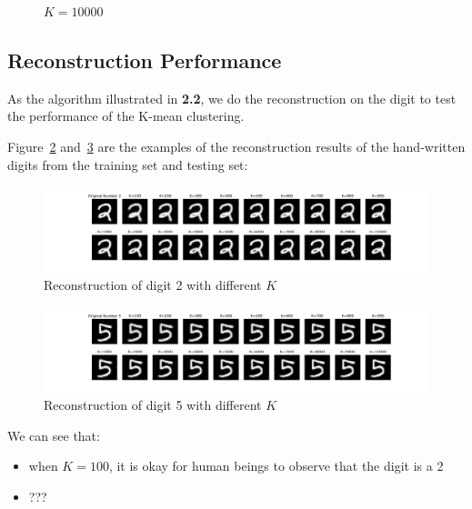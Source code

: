 \documentclass{article}
\begin{document}
\begin{itemize}
\begin{figure}[htbp!]
\begin{minipage}{0.4\textwidth}
        \caption{$K = 10000$}
        \label{fig:10000-centroids}
    \end{minipage}
\end{figure}
    
\end{itemize}
\clearpage

\subsection{Reconstruction Performance}

As the algorithm illustrated in \textbf{2.2}, we do the reconstruction on the digit to test the performance of the K-mean clustering.

Figure~\ref{fig:digit-train} and~\ref{fig:digit-test} are the examples of the reconstruction results of the hand-written digits from the training set and testing set:

\begin{figure}[htbp!]
    \centering
    \includegraphics[width = \textwidth]{K-means/Result/Digits/reconstruct-train-digit.png}
    \caption{Reconstruction of digit 2 with different $K$}
    \label{fig:digit-train}
\end{figure}
\begin{figure}[htbp!]
    \centering
    \includegraphics[width = \textwidth]{K-means/Result/Digits/reconstruct-test-digit.png}
    \caption{Reconstruction of digit 5 with different $K$}
    \label{fig:digit-test}
\end{figure}

We can see that:

\begin{itemize}
    \item when $K = 100$, it is okay for human beings to observe that the digit is a 2
    \item ???
\end{itemize}
\end{document}
